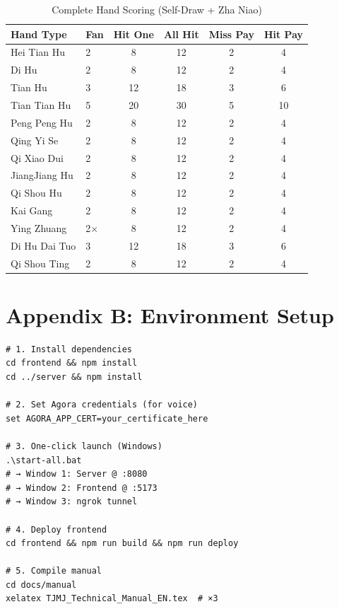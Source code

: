 \documentclass[11pt,a4paper]{article}
\begin{document}
\begin{table}[H]
\centering
\caption{Complete Hand Scoring (Self-Draw + Zha Niao)}
\label{tab:score_full}
\footnotesize
\begin{tabular}{@{}llcccc@{}}
\toprule
\textbf{Hand Type} & \textbf{Fan} & \textbf{Hit One} & \textbf{All Hit} & \textbf{Miss Pay} & \textbf{Hit Pay} \\
\midrule
Hei Tian Hu  & 2 & 8  & 12 & 2  & 4  \\
Di Hu        & 2 & 8  & 12 & 2  & 4  \\
Tian Hu      & 3 & 12 & 18 & 3  & 6  \\
Tian Tian Hu & 5 & 20 & 30 & 5  & 10 \\
Peng Peng Hu & 2 & 8  & 12 & 2  & 4  \\
Qing Yi Se   & 2 & 8  & 12 & 2  & 4  \\
Qi Xiao Dui  & 2 & 8  & 12 & 2  & 4  \\
JiangJiang Hu& 2 & 8  & 12 & 2  & 4  \\
Qi Shou Hu   & 2 & 8  & 12 & 2  & 4  \\
Kai Gang     & 2 & 8  & 12 & 2  & 4  \\
Ying Zhuang  & 2$\times$ & 8  & 12 & 2  & 4  \\
Di Hu Dai Tuo& 3 & 12 & 18 & 3  & 6  \\
Qi Shou Ting & 2 & 8  & 12 & 2  & 4  \\
\bottomrule
\end{tabular}
\end{table}

\newpage
\section*{Appendix B: Environment Setup}

\begin{verbatim}
# 1. Install dependencies
cd frontend && npm install
cd ../server && npm install

# 2. Set Agora credentials (for voice)
set AGORA_APP_CERT=your_certificate_here

# 3. One-click launch (Windows)
.\start-all.bat
# → Window 1: Server @ :8080
# → Window 2: Frontend @ :5173
# → Window 3: ngrok tunnel

# 4. Deploy frontend
cd frontend && npm run build && npm run deploy

# 5. Compile manual
cd docs/manual
xelatex TJMJ_Technical_Manual_EN.tex  # ×3
\end{verbatim}
\end{document}
